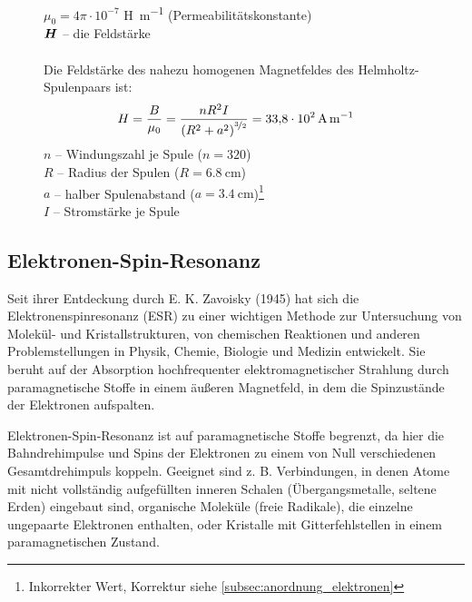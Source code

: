 \documentclass[ngerman]{scrartcl}
\begin{document}
\begin{figure}[H]
\begin{minipage}[b]{0.6\linewidth}
        $\mu_0 = 4 \pi \cdot 10^{-7}$ \si{\henry\per\meter} (Permeabilitätskonstante)\\
        $\vb*{H}$ -- die Feldstärke\\ \\
        Die Feldstärke des nahezu homogenen Magnetfeldes des Helmholtz-Spulenpaars ist:\newline
        \begin{equation}
            {H} = \frac{{B}}{\mu_0} = \frac{n R^2 I}{\left(R^2 + a^2\right)^{\nicefrac{3}{2}}} = \SI{33.8e2}{\ampere\per\meter}
        \end{equation}
        $n$ -- Windungszahl je Spule ($n = 320$)\\
        $R$ -- Radius der Spulen ($R = \SI{6.8}{\centi\meter}$)\\
        $a$ -- halber Spulenabstand ($a = \SI{3.4}{\centi\meter}$)\footnote{Inkorrekter Wert, Korrektur siehe \autoref{subsec:anordnung_elektronen}}\\
        $I$ -- Stromstärke je Spule
    \end{minipage}
\end{figure}
\setcaphanging


\subsection[Elektronen-Spin-Resonanz]{Elektronen-Spin-Resonanz \cite{ref:angabe_esr}}
\label{subsec:grundlagen_elektronenspinresonanz}
%
Seit ihrer Entdeckung durch E. K. Zavoisky (1945) hat sich die Elektronenspinresonanz (ESR) zu einer wichtigen Methode zur Untersuchung von Molekül- und Kristallstrukturen, von chemischen Reaktionen und anderen Problemstellungen in Physik, Chemie, Biologie und Medizin entwickelt. Sie beruht auf der Absorption hochfrequenter elektromagnetischer Strahlung durch paramagnetische Stoffe in einem äußeren Magnetfeld, in dem die Spinzustände der Elektronen aufspalten.

Elektronen-Spin-Resonanz ist auf paramagnetische Stoffe begrenzt, da hier die Bahndrehimpulse und Spins der Elektronen zu einem von Null verschiedenen Gesamtdrehimpuls koppeln. Geeignet sind z. B. Verbindungen, in denen Atome mit nicht vollständig aufgefüllten inneren Schalen (Übergangsmetalle, seltene Erden) eingebaut sind, organische Moleküle (freie Radikale), die einzelne ungepaarte Elektronen enthalten, oder Kristalle mit Gitterfehlstellen in einem paramagnetischen Zustand.
\end{document}
